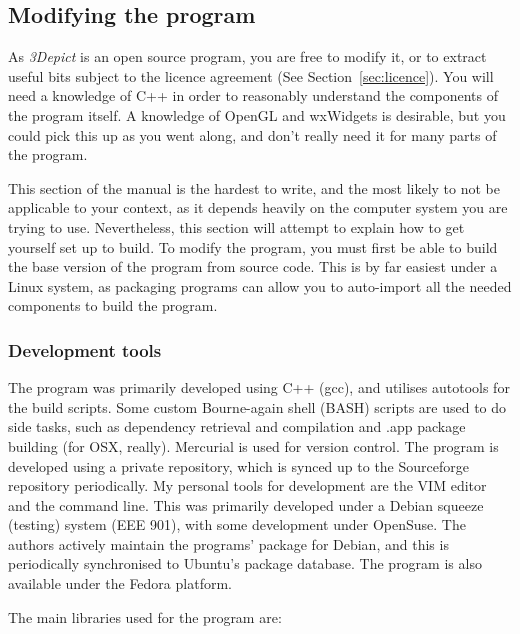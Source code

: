 \documentclass[10pt]{article}
\begin{document}
\subsection{Modifying the program}

As \emph{3Depict} is an open source program, you are free to modify it, or to extract useful bits subject to the licence agreement (See Section~\ref{sec:licence}). You will need a knowledge of C++ in order to reasonably understand the components of the program itself. A knowledge of OpenGL and wxWidgets is desirable, but you could pick this up as you went along, and don't really need it for many parts of the program.

This section of the manual is the hardest to write, and the most likely to not be applicable to your context, as it depends heavily on the computer system you are trying to use. Nevertheless, this section will attempt to explain how to get yourself set up to build. To modify the program, you must first be able to build the base version of the program from source code. This is by far easiest under a Linux system, as packaging programs can allow you to auto-import all the needed components to build the program.

\subsubsection{Development tools}
The program was primarily developed using C++ (gcc), and utilises autotools for the build scripts. Some custom Bourne-again shell (BASH) scripts are used to do side tasks, such as dependency retrieval and compilation and .app package building (for OSX, really). Mercurial is used for version control. The program is developed using a private repository, which is synced up to the Sourceforge repository periodically. My personal tools for development are the VIM editor and the command line.  This was primarily developed under a Debian squeeze (testing) system (EEE 901), with some development under OpenSuse. The authors actively maintain the programs' package for Debian, and this is periodically synchronised to Ubuntu's package database. The program is also available under the Fedora platform.
 
The main libraries used for the program are:
\end{document}
